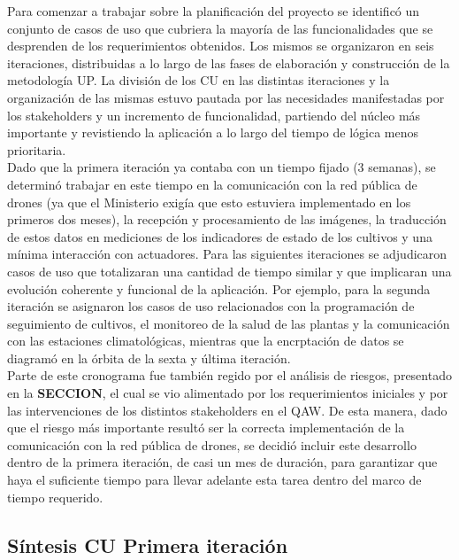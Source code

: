 Para comenzar a trabajar sobre la planificación del proyecto se identificó un conjunto de casos de uso que cubriera la mayoría de las funcionalidades que se desprenden de los requerimientos obtenidos. Los mismos se organizaron en seis iteraciones, distribuidas a lo largo de las fases de elaboración y construcción de la metodología UP. La división de los CU en las distintas iteraciones y la organización de las mismas estuvo pautada por las necesidades manifestadas por los stakeholders y un incremento de funcionalidad, partiendo del núcleo más importante y revistiendo la aplicación a lo largo del tiempo de lógica menos prioritaria.\\
\indent Dado que la primera iteración ya contaba con un tiempo fijado (3 semanas), se determinó trabajar en este tiempo en la comunicación con la red pública de drones (ya que el Ministerio exigía que esto estuviera implementado en los primeros dos meses), la recepción y procesamiento de las imágenes, la traducción de estos datos en mediciones de los indicadores de estado de los cultivos y una mínima interacción con actuadores. Para las siguientes iteraciones se adjudicaron casos de uso que totalizaran una cantidad de tiempo similar y que implicaran una evolución coherente y funcional de la aplicación. Por ejemplo, para la segunda iteración se asignaron los casos de uso relacionados con la programación de seguimiento de cultivos, el monitoreo de la salud de las plantas y la comunicación con las estaciones climatológicas, mientras que la encrptación de datos se diagramó en la órbita de la sexta y última iteración.\\
\indent Parte de este cronograma fue también regido por el análisis de riesgos, presentado en la \textbf{SECCION}, el cual se vio alimentado por los requerimientos iniciales y por las intervenciones de los distintos stakeholders en el QAW. De esta manera, dado que el riesgo más importante resultó ser la correcta implementación de la comunicación con la red pública de drones, se decidió incluir este desarrollo dentro de la primera iteración, de casi un mes de duración, para garantizar que haya el suficiente tiempo para llevar adelante esta tarea dentro del marco de tiempo requerido.

\clearpage

\subsection{Síntesis CU Primera iteración}
		
